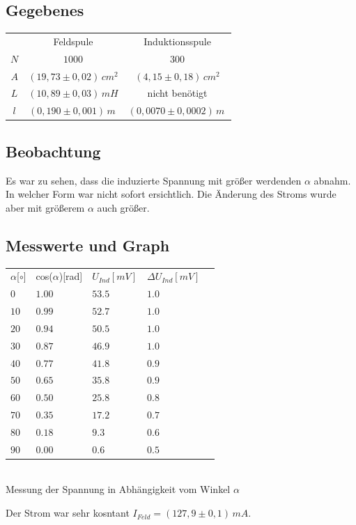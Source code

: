 \documentclass{article}
\begin{document}
\subsection{Gegebenes}
\begin{center}
\begin{tabular}{c c c}
 & Feldspule & Induktionsspule \\
 \(N\) & \(1000\) & \(300\) \\
 \(A\) & \((19,73 \pm 0,02)\, cm^2\) & \((4,15 \pm 0,18)\, cm^2\) \\
 \(L\) & \((10,89 \pm 0,03)\, mH \) & nicht benötigt \\
 \(l\) & \((0,190 \pm 0,001)\, m\ \) & \((0,0070 \pm 0,0002)\, m\ \) \\
\end{tabular}
\end{center}
\subsection{Beobachtung}
Es war zu sehen, dass die induzierte Spannung mit größer werdenden \( \alpha \) abnahm. In welcher Form war nicht sofort ersichtlich. Die Änderung des Stroms wurde aber mit größerem \( \alpha \) auch größer. 
\subsection{Messwerte und Graph}

\begin{center}


\begin{tabular}{l l l l l}
\(\alpha\)[\(\circ\)] & cos(\(\alpha\))[rad] & \(U_{Ind}[mV]\) & \(\Delta U_{Ind}[mV]\) \\
\(0\) &	\(1.00\) &	\(53.5\) &	\(1.0\) \\
\(10\) &	\(0.99\) &	\(52.7\) &	\(1.0\)\\
\(20\) &	\(0.94\) &	\(50.5\) &	\(1.0\)\\
\(30\) &	\(0.87\) &	\(46.9\) &	\(1.0\)\\
\(40\) &	\(0.77\) &	\(41.8\) &	\(0.9\)\\
\(50\) &	\(0.65\) &	\(35.8\) &	\(0.9\)\\
\(60\) &	\(0.50\) &	\(25.8\) &	\(0.8\)\\
\(70\) &	\(0.35\) &	\(17.2\) &	\(0.7\)\\
\(80\) &	\(0.18\) &	\(9.3\) &	\(0.6\)\\
\(90\) &	\(0.00\) &	\(0.6\) &	\(0.5\)\\
\end{tabular}\\
Messung der Spannung in Abhängigkeit vom Winkel \(\alpha\)\\
\end{center}
Der Strom war sehr kosntant \(I_{Feld} = (127,9 \pm 0,1)\, mA\).
\end{document}
